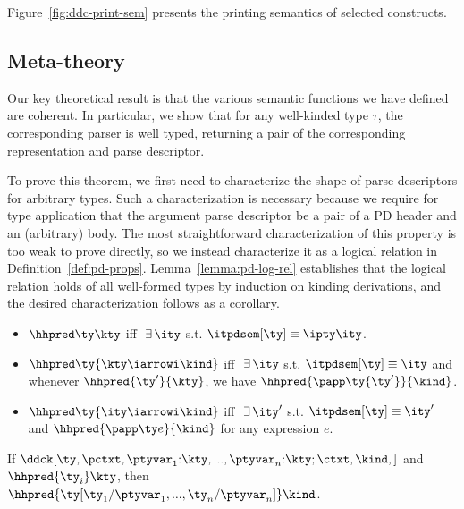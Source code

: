 Figure~\ref{fig:ddc-print-sem} presents the printing semantics of
selected \ddc{} constructs.

\subsection{Meta-theory}
\label{sec:meta-theory}
Our key theoretical result is that the various semantic functions we
have defined are coherent.  In particular, we show that for any 
well-kinded \ddc{} type $\tau$, the corresponding parser is
well typed, returning a pair of the corresponding representation and
parse descriptor.  

To prove this theorem, we first need to characterize the shape of
parse descriptors for arbitrary \ddc{} types.   
Such a characterization is necessary because we require for type
application that the argument parse descriptor be a pair of a PD
header and an (arbitrary) body.
The most straightforward characterization of this property is
too weak to prove directly, so we instead characterize it
as a logical relation in Definition~\ref{def:pd-props}.
Lemma~\ref{lemma:pd-log-rel} establishes that the logical relation
holds of all well-formed \ddc{} types by induction on kinding
derivations, and the desired characterization follows as a corollary.

\begin{definition}
\label{def:pd-props}
\begin{itemize}
\item $\hhpred \ty \kty$ iff $\ \exists\,\ity$ s.t. $\itpdsem[\ty] \equiv
  {\ipty \ity}$.
\item $\hhpred \ty {\kty \iarrowi \kind}$ iff $\ \exists\,\ity$
  s.t. $\itpdsem[\ty] \equiv \ity$ and whenever $\hhpred
  {\ty'}{\kty}$, we have $\hhpred {\papp \ty {\ty'}}{\kind}$.
\item $\hhpred \ty {\ity \iarrowi \kind}$ iff $\ \exists\,\ity'$
  s.t. $\itpdsem[\ty] \equiv \ity'$ and $\hhpred{\papp \ty e}{\kind}$
  for any expression $e$.
\end{itemize}
\end{definition}
\begin{lemma}
\label{lemma:pd-log-rel}
   If
   $\ddck[\ty,{\pctxt,\ptyvar_1{:}\kty,...,\ptyvar_n{:}\kty;\ctxt},\kind,{}]$ 
   and $\hhpred {\ty_i} \kty$, then \\ 
   $\hhpred {\ty[\ty_1/\ptyvar_1,...,\ty_n/\ptyvar_n]} \kind$.
\end{lemma}

